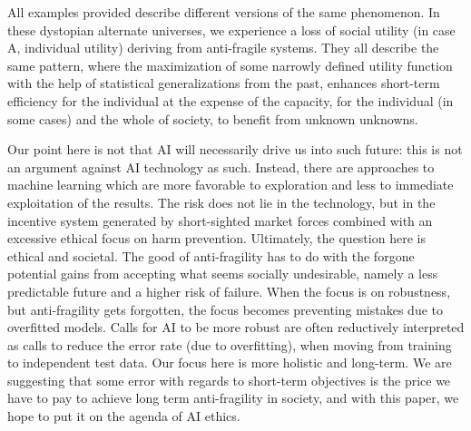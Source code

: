 \documentclass[conference]{IEEEtran}
\begin{document}
All examples provided describe different versions of the same phenomenon. In these dystopian alternate universes, we experience a loss of social utility (in case A, individual utility) deriving from anti-fragile systems. They all describe the same pattern, where the maximization of some narrowly defined utility function with the help of statistical generalizations from the past, enhances short-term efficiency for the individual at the expense of the capacity, for the individual (in some cases) and the whole of society, to benefit from unknown unknowns. 

Our point here is not that AI will necessarily drive us into such future: this is not an argument against AI technology as such. Instead, there are approaches to machine learning which are more favorable to exploration and less to immediate exploitation of the results. The risk does not lie in the technology, but in the incentive system generated by short-sighted market forces combined with an excessive ethical focus on harm prevention. Ultimately, the question here is ethical and societal. The good of anti-fragility has to do with the forgone potential gains from accepting what seems socially undesirable, namely a less predictable future and a higher risk of failure. When the focus is on robustness, but anti-fragility gets forgotten, the focus becomes preventing mistakes due to overfitted models. Calls for AI to be more robust are often reductively interpreted as calls to reduce the error rate (due to overfitting), when moving from training to independent test data. Our focus here is more holistic and long-term. We are suggesting that some error with regards to short-term objectives is the price we have to pay to achieve long term anti-fragility in society, and with this paper, we hope to put it on the agenda of AI ethics.



\end{document}
